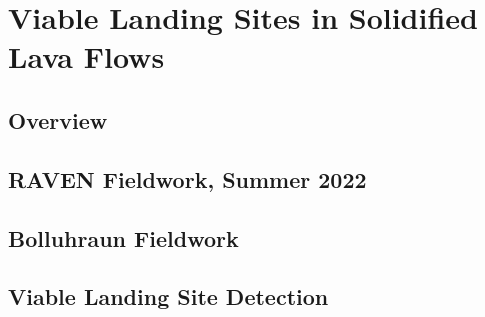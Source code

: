 \documentclass[10pt,twoside,b5paper]{book}
\begin{document}
	\chapter{Viable Landing Sites in Solidified Lava Flows}
		\section{Overview}
		\section{RAVEN Fieldwork, Summer 2022}
		\section{Bolluhraun Fieldwork}
		\section{Viable Landing Site Detection}

	
	
\end{document}
